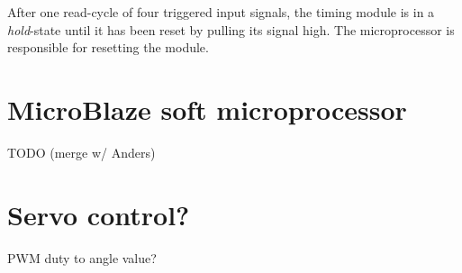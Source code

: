 After one read-cycle of four triggered input signals, the timing module is in a \emph{hold}-state until it has been reset by pulling its  signal high.
The microprocessor is responsible for resetting the module.


\section{MicroBlaze soft microprocessor}
TODO (merge w/ Anders)

\section{Servo control?}
PWM duty to angle value?

